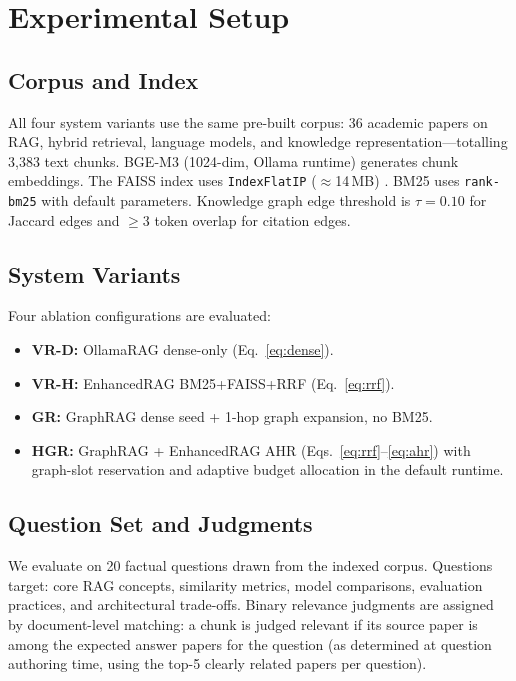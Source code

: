 \documentclass[conference,10pt,twocolumn]{IEEEtran}
\begin{document}
\section{Experimental Setup}
\label{sec:setup}

\subsection{Corpus and Index}

All four system variants use the same pre-built corpus: 36 academic papers on RAG, hybrid retrieval, language models, and knowledge representation---totalling 3,383 text chunks. BGE-M3 (1024-dim, Ollama runtime) generates chunk embeddings. The FAISS index uses \texttt{IndexFlatIP} ($\approx$14\,MB) \cite{johnson2021faiss}. BM25 uses \texttt{rank-bm25} with default parameters. Knowledge graph edge threshold is $\tau=0.10$ for Jaccard edges and $\geq 3$ token overlap for citation edges.

\subsection{System Variants}

Four ablation configurations are evaluated:
\begin{itemize}
  \item \textbf{VR-D:} OllamaRAG dense-only (Eq.~\ref{eq:dense}).
  \item \textbf{VR-H:} EnhancedRAG BM25+FAISS+RRF (Eq.~\ref{eq:rrf}).
  \item \textbf{GR:} GraphRAG dense seed + 1-hop graph expansion, no BM25.
  \item \textbf{HGR:} GraphRAG + EnhancedRAG AHR (Eqs.~\ref{eq:rrf}--\ref{eq:ahr}) with graph-slot reservation and adaptive budget allocation in the default runtime.
\end{itemize}

\subsection{Question Set and Judgments}

We evaluate on 20 factual questions drawn from the indexed corpus. Questions target: core RAG concepts, similarity metrics, model comparisons, evaluation practices, and architectural trade-offs. Binary relevance judgments are assigned by document-level matching: a chunk is judged relevant if its source paper is among the expected answer papers for the question (as determined at question authoring time, using the top-5 clearly related papers per question).
\end{document}
